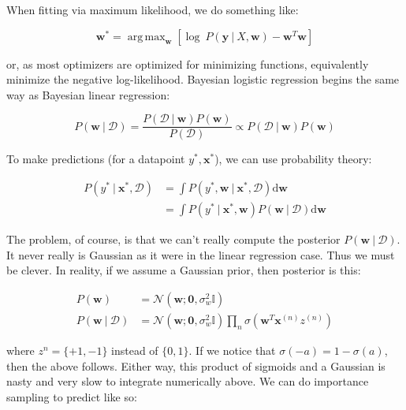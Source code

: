 \documentclass{article}
\newcommand{\vf}[1]{\mathbf{#1}}
\newcommand{\normal}{\mathcal{N}}
\newcommand{\bx}{\vf{x}}
\newcommand{\by}{\vf{y}}
\newcommand{\bw}{\vf{w}}
\newcommand{\giv}{\ |\ }
\newcommand{\data}{\mathcal{D}}
\DeclareMathOperator*{\argmax}{arg\,max}
\newcommand{\de}{\text{d}}
\begin{document}
When fitting via maximum likelihood, we do something like:

\begin{equation*}
    \bw^* = \argmax_{\bw} [ \log\ P(\by \giv X, \bw) -  \bw^T \bw ]
\end{equation*}

or, as most optimizers are optimized for minimizing functions, equivalently minimize the negative log-likelihood. Bayesian logistic regression begins the same way as Bayesian linear regression:

\begin{equation*}
    P(\bw \giv \data) = \frac{P(\data \giv \bw) P(\bw)}{P(\data)} \propto P(\data \giv \bw) P(\bw)
\end{equation*}

To make predictions (for a datapoint $y^*, \bx^*$), we can use probability theory:

\begin{align*}
    P(y^* \giv \bx^*, \data) &= \int P(y^*, \bw \giv \bx^*, \data) \de\bw \\
        &= \int P(y^* \giv \bx^*, \bw) P(\bw \giv \data) \de\bw
\end{align*}

The problem, of course, is that we can't really compute the posterior $P(\bw \giv \data)$. It never really is Gaussian as it were in the linear regression case. Thus we must be clever. In reality, if we assume a Gaussian prior, then posterior is this:

\begin{align*}
    P(\bw) &= \normal(\bw; \mathbf{0}, \sigma_w^2 \mathbb{I}) \\
    P(\bw \giv \data) &= \normal(\bw; \mathbf{0}, \sigma_w^2 \mathbb{I})
        \prod_n \sigma(\bw^T \bx^{(n)} z^{(n)})
\end{align*}

where $z^{n} = \{ +1, -1 \}$ instead of $\{0, 1\}$. If we notice that $\sigma(-a) = 1 - \sigma(a)$, then the above follows. Either way, this product of sigmoids and a Gaussian is nasty and very slow to integrate numerically above. We can do importance sampling to predict like so:
\end{document}
